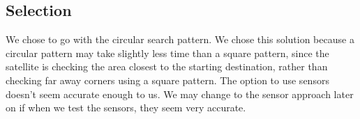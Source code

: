 \documentclass[10pt,serif,draftclsnofoot,onecolumn]{IEEEtran}
\begin{document}
\subsection{Selection}
We chose to go with the circular search pattern. We chose this solution because a circular pattern may take slightly less time than a square pattern, since the satellite is checking the area closest to the starting destination, rather than checking far away corners using a square pattern. The option to use sensors doesn’t seem accurate enough to us. We may change to the sensor approach later on if when we test the sensors, they seem very accurate.

\newpage
\end{document}
